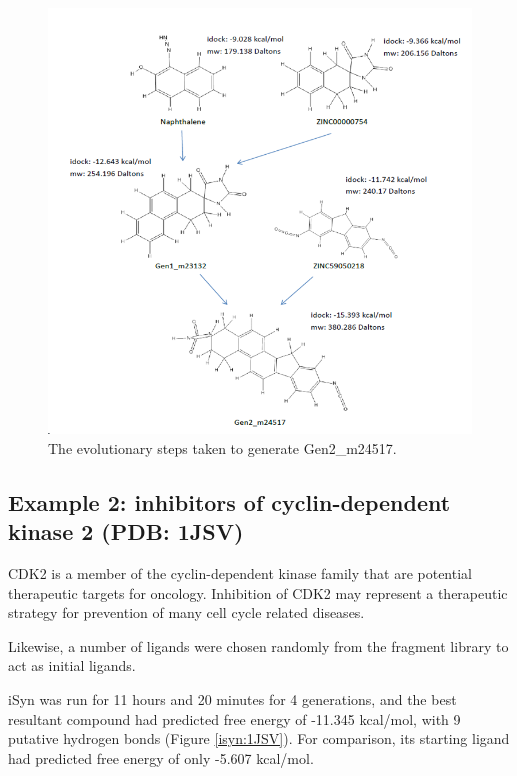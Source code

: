 \begin{figure}
\begin{center}
\includegraphics[width=\linewidth]{../isyn/Gen2_m24517.png}
\end{center}
\caption{The evolutionary steps taken to generate Gen2\_m24517.}
\label{isyn:Gen2_m24517}
\end{figure}

\subsection{Example 2: inhibitors of cyclin-dependent kinase 2 (PDB: 1JSV)}

CDK2 is a member of the cyclin-dependent kinase family that are potential therapeutic targets for oncology. Inhibition of CDK2 may represent a therapeutic strategy for prevention of many cell cycle related diseases.

Likewise, a number of ligands were chosen randomly from the fragment library to act as initial ligands.

iSyn was run for 11 hours and 20 minutes for 4 generations, and the best resultant compound had predicted free energy of -11.345 kcal/mol, with 9 putative hydrogen bonds (Figure \ref{isyn:1JSV}). For comparison, its starting ligand had predicted free energy of only -5.607 kcal/mol.

